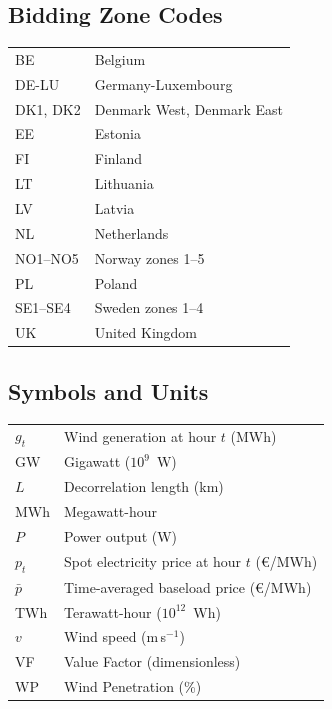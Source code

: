 \documentclass[letterpaper, 11pt]{article}%
\begin{document}
\vspace{0.5cm}
\subsection*{Bidding Zone Codes}
\begin{tabular}{@{}l l@{}}
BE & Belgium \\
DE-LU & Germany-Luxembourg \\
DK1, DK2 & Denmark West, Denmark East \\
EE & Estonia \\
FI & Finland \\
LT & Lithuania \\
LV & Latvia \\
NL & Netherlands \\
NO1--NO5 & Norway zones 1--5 \\
PL & Poland \\
SE1--SE4 & Sweden zones 1--4 \\
UK & United Kingdom \\
\end{tabular}


\newpage
\thispagestyle{empty}


\subsection*{Symbols and Units}
\begin{tabular}{@{}l l@{}}
$g_t$ & Wind generation at hour $t$ (MWh) \\
GW & Gigawatt ($10^9$~W) \\
$L$ & Decorrelation length (km) \\
MWh & Megawatt-hour \\
$P$ & Power output (W) \\
$p_t$ & Spot electricity price at hour $t$ (\euro/MWh) \\
$\bar{p}$ & Time-averaged baseload price (\euro/MWh) \\
TWh & Terawatt-hour ($10^{12}$~Wh) \\
$v$ & Wind speed (m\,s$^{-1}$) \\
VF & Value Factor (dimensionless) \\
WP & Wind Penetration (\%) \\
\end{tabular}



\newpage

\setcounter{page}{1}













\end{document}

